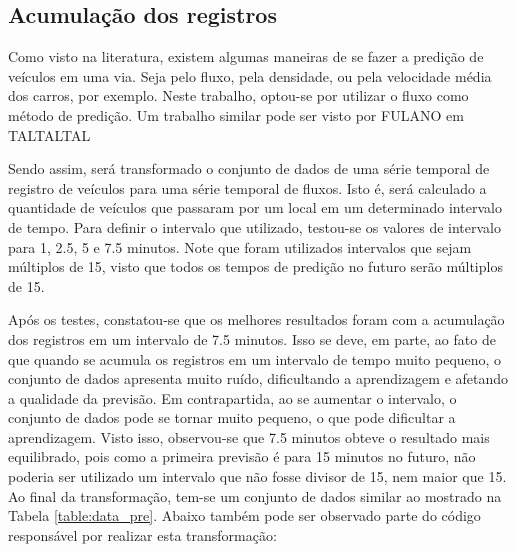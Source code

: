 \subsection{Acumulação dos registros}

Como visto na literatura, existem algumas maneiras de se fazer a predição de veículos em uma via. Seja pelo fluxo, pela densidade, ou pela velocidade média dos carros, por exemplo. Neste trabalho, optou-se por utilizar o fluxo como método de predição. Um trabalho similar pode ser visto por FULANO em TALTALTAL


Sendo assim, será transformado o conjunto de dados de uma série temporal de registro de veículos para uma série temporal de fluxos. Isto é, será calculado a quantidade de veículos que passaram por um local em um determinado intervalo de tempo. Para definir o intervalo que utilizado, testou-se os valores de intervalo para 1, 2.5, 5 e 7.5 minutos. Note que foram utilizados intervalos que sejam múltiplos de 15, visto que todos os tempos de predição no futuro serão múltiplos de 15.

Após os testes, constatou-se que os melhores resultados foram com a acumulação dos registros em um intervalo de 7.5 minutos. Isso se deve, em parte, ao fato de que quando se acumula os registros em um intervalo de tempo muito pequeno, o conjunto de dados apresenta muito ruído, dificultando a aprendizagem e afetando a qualidade da previsão. Em contrapartida, ao se aumentar o intervalo, o conjunto de dados pode se tornar muito pequeno, o que pode dificultar a aprendizagem. Visto isso, observou-se que 7.5 minutos obteve o resultado mais equilibrado, pois como a primeira previsão é para 15 minutos no futuro, não poderia ser utilizado um intervalo que não fosse divisor de 15, nem maior que 15. Ao final da transformação, tem-se um conjunto de dados similar ao mostrado na Tabela \ref{table:data_pre}. Abaixo também pode ser observado parte do código responsável por realizar esta transformação:

